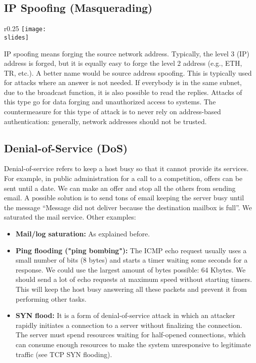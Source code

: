\subsection{IP Spoofing (Masquerading)}
\begin{wrapfigure}{r}{0.25\textwidth}
  \centering
  \texttt{[image: \\slides]}
\end{wrapfigure}
IP spoofing means forging the source network address. Typically, the level 3 (IP) address is forged, but it is equally easy to forge the level 2 address (e.g., ETH, TR, etc.). A better name would be source address spoofing. This is typically used for attacks where an answer is not needed. If everybody is in the same subnet, due to the broadcast function, it is also possible to read the replies. Attacks of this type go for data forging and unauthorized access to systems. The countermeasure for this type of attack is to never rely on address-based authentication: generally, network addresses should not be trusted.

\subsection{Denial-of-Service (DoS)}
Denial-of-service refers to keep a host busy so that it cannot provide its services. For example, in public
administration for a call to a competition, offers can be sent until a date. We can make an offer and stop all the
others from sending email. A possible solution is to send tons of email keeping the server busy until the
message “Message did not deliver because the destination mailbox is full”. We saturated the mail service.
Other examples:
\begin{itemize}
  \item \textbf{Mail/log saturation:} As explained before.
  \item \textbf{Ping flooding ("ping bombing"):} The ICMP echo request usually uses a small number of bits (8 bytes) and starts a timer waiting some seconds for a response. We could use the largest amount of bytes possible: 64 Kbytes. We should send a lot of echo requests at maximum speed without starting timers. This will keep the host busy answering all these packets and prevent it from performing other tasks.
  \item \textbf{SYN flood:} It is a form of denial-of-service attack in which an attacker rapidly initiates a connection to a server without finalizing the connection. The server must spend resources waiting for half-opened connections, which can consume enough resources to make the system unresponsive to legitimate traffic (see TCP SYN flooding).
\end{itemize}

